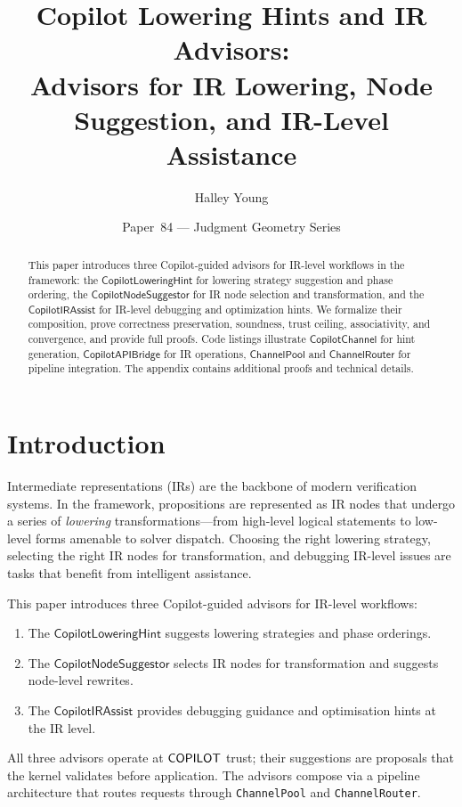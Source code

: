 \documentclass[11pt]{article}
\title{\textbf{Copilot Lowering Hints and IR Advisors:\\ Advisors for IR Lowering, Node Suggestion, and IR-Level Assistance}}
\author{Halley Young}
\date{Paper~84 --- Judgment Geometry Series}
\newcommand{\LowHint}{\mathsf{CopilotLoweringHint}}
\newcommand{\NodeSugg}{\mathsf{CopilotNodeSuggestor}}
\newcommand{\IRAssist}{\mathsf{CopilotIRAssist}}
\newcommand{\CopChan}{\mathsf{CopilotChannel}}
\newcommand{\CopBridge}{\mathsf{CopilotAPIBridge}}
\newcommand{\ChanPool}{\mathsf{ChannelPool}}
\newcommand{\Route}{\mathsf{ChannelRouter}}
\begin{document}
\maketitle

\begin{abstract}
This paper introduces three Copilot-guided advisors for IR-level workflows in the \JuGeo{} framework: the $\LowHint$ for lowering strategy suggestion and phase ordering, the $\NodeSugg$ for IR node selection and transformation, and the $\IRAssist$ for IR-level debugging and optimization hints. We formalize their composition, prove correctness preservation, soundness, trust ceiling, associativity, and convergence, and provide full proofs. Code listings illustrate $\CopChan$ for hint generation, $\CopBridge$ for IR operations, $\ChanPool$ and $\Route$ for pipeline integration. The appendix contains additional proofs and technical details.
\end{abstract}

\section{Introduction}\label{sec:intro}

Intermediate representations (IRs) are the backbone of modern
verification systems.  In the \JuGeo{} framework, propositions
are represented as IR nodes that undergo a series of
\emph{lowering} transformations---from high-level logical
statements to low-level forms amenable to solver dispatch.
Choosing the right lowering strategy, selecting the right
IR nodes for transformation, and debugging IR-level issues
are tasks that benefit from intelligent assistance.

This paper introduces three Copilot-guided advisors for
IR-level workflows:

\begin{enumerate}
\item The $\LowHint$ suggests lowering strategies and
      phase orderings.
\item The $\NodeSugg$ selects IR nodes for transformation
      and suggests node-level rewrites.
\item The $\IRAssist$ provides debugging guidance and
      optimisation hints at the IR level.
\end{enumerate}

All three advisors operate at $\mathsf{COPILOT}$ trust; their
suggestions are proposals that the kernel validates before
application.  The advisors compose via a pipeline architecture
that routes requests through \texttt{ChannelPool} and
\texttt{ChannelRouter}.
\end{document}
